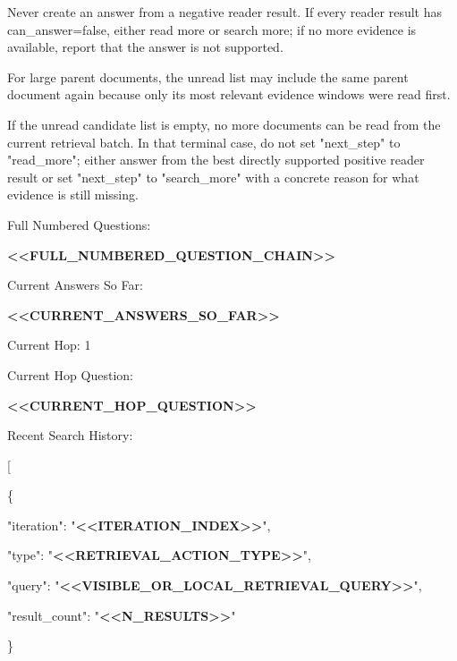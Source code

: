 \begin{tcolorbox}[colback=white, colframe=my-green, coltitle=black, parskip=5mm, title=\textbf{Hop Resolve}, halign=flush left, enhanced, breakable, skin first=enhanced, skin middle=enhanced, skin last=enhanced]
\begin{scriptsize}
Never create an answer from a negative reader result. If every reader result has can\_answer=false, either read more or search more; if no more evidence is available, report that the answer is not supported.\par
For large parent documents, the unread list may include the same parent document again because only its most relevant evidence windows were read first.\par
If the unread candidate list is empty, no more documents can be read from the current retrieval batch. In that terminal case, do not set "next\_step" to "read\_more"; either answer from the best directly supported positive reader result or set "next\_step" to "search\_more" with a concrete reason for what evidence is still missing.\par
\mbox{}\par
Full Numbered Questions:\par
\textcolor{my-green}{\textbf{\textless{}\textless{}FULL\_NUMBERED\_QUESTION\_CHAIN\textgreater{}\textgreater{}}}\par
\mbox{}\par
Current Answers So Far:\par
\textcolor{my-green}{\textbf{\textless{}\textless{}CURRENT\_ANSWERS\_SO\_FAR\textgreater{}\textgreater{}}}\par
\mbox{}\par
Current Hop: 1\par
Current Hop Question:\par
\textcolor{my-green}{\textbf{\textless{}\textless{}CURRENT\_HOP\_QUESTION\textgreater{}\textgreater{}}}\par
\mbox{}\par
Recent Search History:\par
[\par
  \{\par
    "iteration": "\textcolor{my-green}{\textbf{\textless{}\textless{}ITERATION\_INDEX\textgreater{}\textgreater{}}}",\par
    "type": "\textcolor{my-green}{\textbf{\textless{}\textless{}RETRIEVAL\_ACTION\_TYPE\textgreater{}\textgreater{}}}",\par
    "query": "\textcolor{my-green}{\textbf{\textless{}\textless{}VISIBLE\_OR\_LOCAL\_RETRIEVAL\_QUERY\textgreater{}\textgreater{}}}",\par
    "result\_count": "\textcolor{my-green}{\textbf{\textless{}\textless{}N\_RESULTS\textgreater{}\textgreater{}}}"\par
  \}\par

\end{scriptsize}
\end{tcolorbox}
